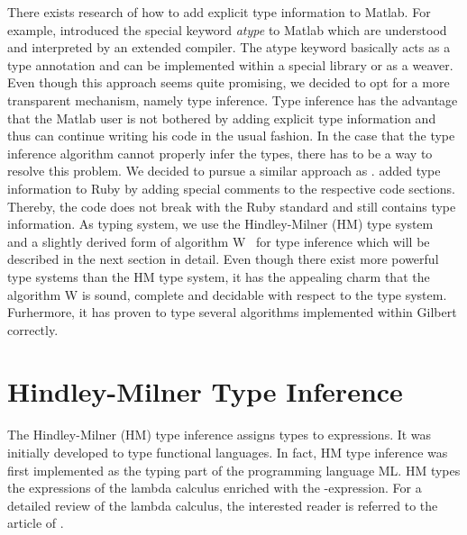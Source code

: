 There exists research of how to add explicit type information to Matlab.
For example, \textcite{hendren:2011a} introduced the special keyword \emph{atype} to Matlab which are understood and interpreted by an extended compiler.
The atype keyword basically acts as a type annotation and can be implemented within a special library or as a weaver.
Even though this approach seems quite promising, we decided to opt for a more transparent mechanism, namely type inference.
Type inference has the advantage that the Matlab user is not bothered by adding explicit type information and thus can continue writing his code in the usual fashion.
In the case that the type inference algorithm cannot properly infer the types, there has to be a way to resolve this problem.
We decided to pursue a similar approach as \textcite{furr:2009a}.
\citeauthor{furr:2009a} added type information to Ruby by adding special comments to the respective code sections.
Thereby, the code does not break with the Ruby standard and still contains type information.
As typing system, we use the Hindley-Milner (HM) type system~\cite{hindley:tams1969a,milner:jcss1978a} and a slightly derived form of algorithm W~\cite{damas:1982a} for type inference which will be described in the next section in detail.
Even though there exist more powerful type systems than the HM type system, it has the appealing charm that the algorithm W is sound, complete and decidable with respect to the type system.
Furhermore, it has proven to type several algorithms implemented within Gilbert correctly.

\section{Hindley-Milner Type Inference}

The Hindley-Milner (HM) type inference assigns types to expressions.
It was initially developed to type functional languages.
In fact, HM type inference was first implemented as the typing part of the programming language ML.
HM types the expressions of the lambda calculus enriched with the -expression.
For a detailed review of the lambda calculus, the interested reader is referred to the article of \textcite{cardone:hhl2006a}.

